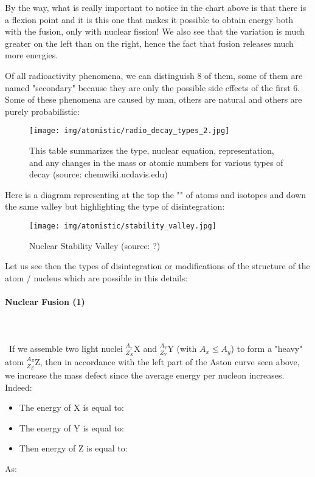 	By the way, what is really important to notice in the chart above is that there is a flexion point and it is this one that makes it possible to obtain energy both with the fusion, only with nuclear fission! We also see that the variation is much greater on the left than on the right, hence the fact that fusion releases much more energies.

	Of all radioactivity phenomena, we can distinguish $8$ of them, some of them are named "secondary" because they are only the possible side effects of the first $6$. Some of these phenomena are caused by man, others are natural and others are purely probabilistic:
	\begin{figure}[H]
		\centering
		\texttt{[image: img/atomistic/radio\_decay\_types\_2.jpg]}
		\caption[Summary of the type, nuclear equation, representation, and any changes in the mass or atomic numbers for various types of decay]{This table summarizes the type, nuclear equation, representation, and any changes in the mass or atomic numbers for various types of decay (source: chemwiki.ucdavis.edu)}
	\end{figure}
	Here is a diagram representing at the top the "\label{valley of stability}" of atoms and isotopes and down the same valley but highlighting the type of disintegration:
	\begin{figure}[H]
		\centering
		\texttt{[image: img/atomistic/stability\_valley.jpg]}
		\caption[Nuclear Stability Valley]{Nuclear Stability Valley (source: ?)}
	\end{figure}
	Let us see then the types of disintegration or modifications of the structure of the atom / nucleus which are possible in this details:
	
	\paragraph{Nuclear Fusion (1)}\label{nuclear fusion}\mbox{}\\\\\
	If we assemble two light nuclei $_{Z_X}^{A_x}\mathrm{X}$ and $_{Z_Y}^{A_Y}\mathrm{Y}$ (with $A_x \le A_y$) to form a "heavy" atom $_{Z_Z}^{A_Z}\mathrm{Z}$, then in accordance with the left part of the Aston curve seen above, we increase the mass defect since the average energy per nucleon increases. Indeed:
	\begin{itemize}
		\item The energy of $\mathrm{X}$ is equal to:
		
	
		\item The energy of $\mathrm{Y}$ is equal to:
		
		
		\item Then energy of $\mathrm{Z}$ is equal to:
		
	\end{itemize}
	As:
	
